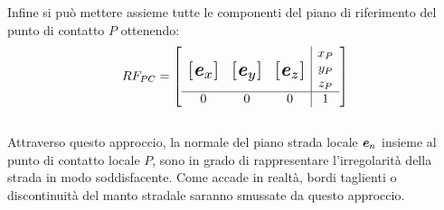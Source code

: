Infine si può mettere assieme tutte le componenti del piano di riferimento del punto di contatto $P$ ottenendo:
%
\begin{equation}
RF_{PC} = \left[
\begin{array}{ccc|c}
& & & x_P\\
\multirow{3}{*}{\raisebox{20mm}{\scalebox{1.5}{$\left[\textbf{\textit{e}}_x\right]$}}} & \multirow{3}{*}{\raisebox{20mm}{\scalebox{1.5}{$\left[\textbf{\textit{e}}_y\right]$}}} & \multirow{3}{*}{\raisebox{20mm}{\scalebox{1.5}{$\left[\textbf{\textit{e}}_z\right]$}}} & y_P\\
& & & z_P\\ \hline
0 & 0 & 0 & 1
\end{array}\right]
\end{equation}\\
Attraverso questo approccio, la normale del piano strada locale $\textbf{\textit{e}}_{n}$ insieme al punto di contatto locale $P$, sono in grado di rappresentare l'irregolarità della strada in modo soddisfacente. Come accade in realtà, bordi taglienti o discontinuità del manto stradale saranno smussate da questo approccio.